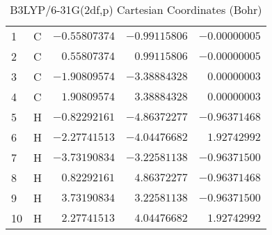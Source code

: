 \documentclass[10pt,oneside]{article}
\begin{document}
\begin{table}[h!]
\centering
\caption{B3LYP/6-31G(2df,p) Cartesian Coordinates (Bohr)}
\begin{tabular}{llrrr}
1  & C  & $-0.55807374$ & $-0.99115806$ & $-0.00000005$ \\
2  & C  & $ 0.55807374$ & $ 0.99115806$ & $-0.00000005$ \\
3  & C  & $-1.90809574$ & $-3.38884328$ & $ 0.00000003$ \\
4  & C  & $ 1.90809574$ & $ 3.38884328$ & $ 0.00000003$ \\
5  & H  & $-0.82292161$ & $-4.86372277$ & $-0.96371468$ \\
6  & H  & $-2.27741513$ & $-4.04476682$ & $ 1.92742992$ \\
7  & H  & $-3.73190834$ & $-3.22581138$ & $-0.96371500$ \\
8  & H  & $ 0.82292161$ & $ 4.86372277$ & $-0.96371468$ \\
9  & H  & $ 3.73190834$ & $ 3.22581138$ & $-0.96371500$ \\
10 & H  & $ 2.27741513$ & $ 4.04476682$ & $ 1.92742992$ \\
\end{tabular}
\end{table}

\clearpage
\end{document}
